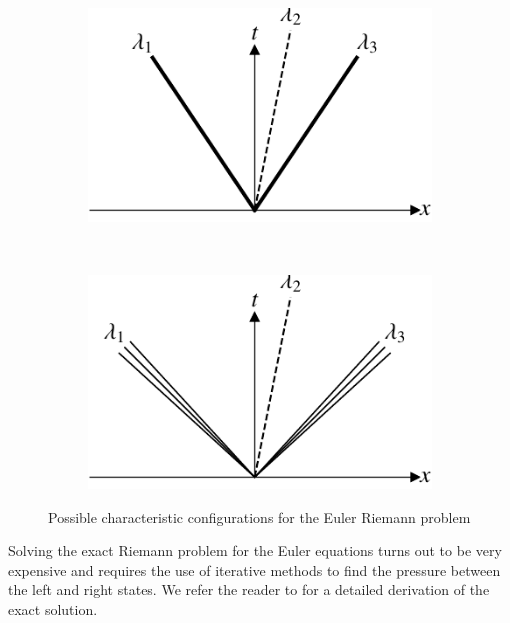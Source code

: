 \begin{figure}[htb]
\begin{subfigure}[b]{0.35\linewidth}
		\includegraphics[width=\linewidth]{Pictures/euler_characteristics_2.pdf}
		\caption{}
	\end{subfigure}~
	\begin{subfigure}[b]{0.35\linewidth}
		\includegraphics[width=\linewidth]{Pictures/euler_characteristics_3.pdf}
		\caption{}
	\end{subfigure}
	\caption{Possible characteristic configurations for the Euler Riemann problem}
	\label{fig:euler_characteristics}
\end{figure}

Solving the exact Riemann problem for the Euler equations turns out to be very expensive and requires the use of iterative methods to find the pressure between the left and right states. We refer the reader to \cite{levequeFiniteVolumeMethods2002,toroRiemannSolversEvolved2006} for a detailed derivation of the exact solution.
